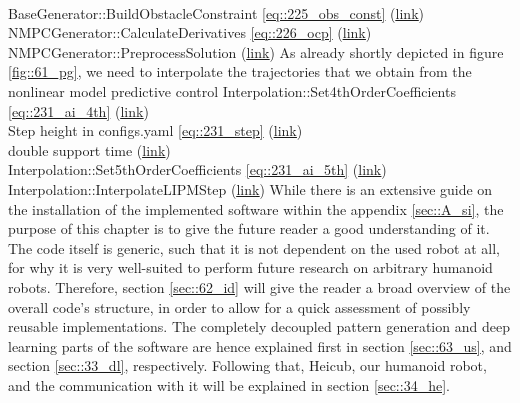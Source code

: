 \\
BaseGenerator::BuildObstacleConstraint \ref{eq::225_obs_const}
(\href{https://github.com/mhubii/nmpc_pattern_generator/blob/dc1f5a9366cbbbf76f1b02cada642f6ac9a04c89/libs/pattern_generator/src/base_generator.cpp#L1271}{\underline{link}})
\\
NMPCGenerator::CalculateDerivatives \ref{eq::226_ocp}
(\href{https://github.com/mhubii/nmpc_pattern_generator/blob/dc1f5a9366cbbbf76f1b02cada642f6ac9a04c89/libs/pattern_generator/src/nmpc_generator.cpp#L377}{\underline{link}})
\\
NMPCGenerator::PreprocessSolution
(\href{https://github.com/mhubii/nmpc_pattern_generator/blob/dc1f5a9366cbbbf76f1b02cada642f6ac9a04c89/libs/pattern_generator/src/nmpc_generator.cpp#L155}{\underline{link}})
As already shortly depicted in figure \ref{fig::61_pg}, we need to interpolate the trajectories that we obtain from the nonlinear model predictive control
Interpolation::Set4thOrderCoefficients \ref{eq::231_ai_4th}
(\href{https://github.com/mhubii/nmpc_pattern_generator/blob/c82c64a28da7527e75442764f585bd50a8f61ee9/libs/pattern_generator/src/interpolation.cpp#L779}{\underline{link}})
\\
Step height in configs.yaml \ref{eq::231_step}
(\href{https://github.com/mhubii/nmpc_pattern_generator/blob/c82c64a28da7527e75442764f585bd50a8f61ee9/libs/pattern_generator/configs.yaml#L22}{\underline{link}})
\\
double support time 
(\href{https://github.com/mhubii/nmpc_pattern_generator/blob/c82c64a28da7527e75442764f585bd50a8f61ee9/libs/pattern_generator/configs.yaml#L21}{\underline{link}})
\\
Interpolation::Set5thOrderCoefficients \ref{eq::231_ai_5th}
(\href{https://github.com/mhubii/nmpc_pattern_generator/blob/c82c64a28da7527e75442764f585bd50a8f61ee9/libs/pattern_generator/src/interpolation.cpp#L806}{\underline{link}})
\\
Interpolation::InterpolateLIPMStep
(\href{https://github.com/mhubii/nmpc_pattern_generator/blob/5a213044c927dc6aac9f7e32ce1e5fb472cd67bb/libs/pattern_generator/src/interpolation.cpp#L776}{\underline{link}})
While there is an extensive guide on the installation of the implemented software within the appendix \ref{sec::A_si}, the purpose of this chapter is to give the future reader a good understanding of it. The code itself is generic, such that it is not dependent on the used robot at all, for why it is very well-suited to perform future research on arbitrary humanoid robots. Therefore, section \ref{sec::62_id} will give the reader a broad overview of the overall code's structure, in order to allow for a quick assessment of possibly reusable implementations. The completely decoupled pattern generation and deep learning parts of the software are hence explained first in section \ref{sec::63_us}, and section \ref{sec::33_dl}, respectively. Following that, Heicub, our humanoid robot, and the communication with it will be explained in section \ref{sec::34_he}.

